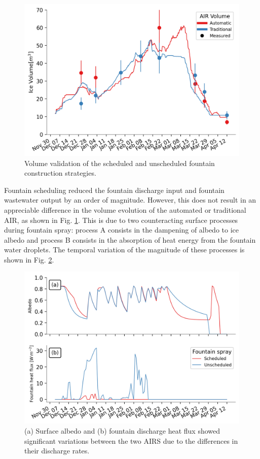 \begin{figure}[htb] \includegraphics[width=\textwidth] {figs/CH_validation.png} \caption{Volume validation of the
scheduled and unscheduled fountain construction strategies.} \label{fig:validation} \end{figure}

Fountain scheduling reduced the fountain discharge input and fountain wastewater output by an order of
magnitude. However, this does not result in an appreciable difference in the volume evolution of the automated
or traditional AIR, as shown in Fig. \ref{fig:validation}. This is due to two counteracting surface processes
during fountain spray: process A consists in the dampening of albedo to ice albedo and process B consists in the
absorption of heat energy from the fountain water droplets. The temporal variation of the magnitude of these
processes is shown in Fig. \ref{fig:dis_processes}.

\begin{figure}[htb]
\includegraphics[width=\textwidth]{figs/dis_processes.png}
\caption{(a) Surface albedo  and (b) fountain discharge heat flux showed significant variations between the two
  AIRS due to the differences in their discharge rates.}
\label{fig:dis_processes}
\end{figure}

